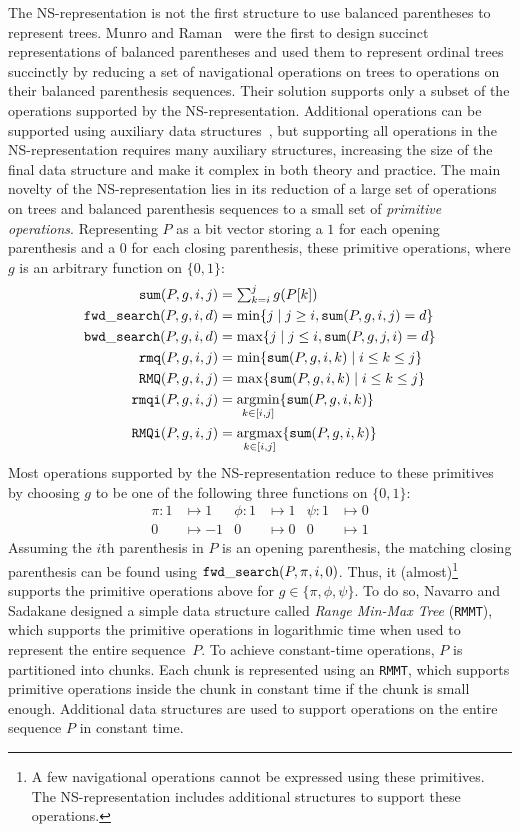 The NS-representa\-tion is not the first structure to use balanced
parentheses to represent trees.  Munro and Raman~\cite{mr1997} were
the first to design succinct representations of balanced parentheses
and used them to represent ordinal trees succinctly by reducing a set
of navigational operations on trees to operations on their balanced
parenthesis sequences.  Their solution supports only a subset of the
operations supported by the NS-representation.  Additional operations
can be supported using auxiliary data structures~\cite{ly2008}, but
supporting all operations in the NS-representation requires many
auxiliary structures, increasing the size of the final data structure
and make it complex in both theory and practice.  The main novelty of
the NS-representation lies in its reduction of a large set of
operations on trees and balanced parenthesis sequences to a small set
of \emph{primitive operations}.  Representing $P$ as a bit vector
storing a $1$ for each opening parenthesis and a $0$ for each closing
parenthesis, these primitive operations, where $g$ is an arbitrary
function on $\{0,1\}$:
  \begin{align*}
    \mathtt{sum}(P,g,i,j) &= \textstyle\sum_{k=i}^jg(P[k])\\
    \mathtt{fwd\_search}(P,g,i,d) &= \min\{j \mid j \ge i, \mathtt{sum}(P,g,i,j) = d\}\\
    \mathtt{bwd\_search}(P,g,i,d) &= \max\{j \mid j \le i, \mathtt{sum}(P,g,j,i) = d\}\\
    \mathtt{rmq}(P,g,i,j) &= \min\{\mathtt{sum}(P,g,i,k) \mid i\le k\le j\}\\
    \mathtt{RMQ}(P,g,i,j) &= \max\{\mathtt{sum}(P,g,i,k) \mid i\le k\le j\}\\
    \mathtt{rmqi}(P,g,i,j) &= \operatorname*{arg\!\min}_{k\in[i,j]}\{\mathtt{sum}(P,g,i,k)\}\\
    \mathtt{RMQi}(P,g,i,j) &= \operatorname*{arg\!\max}_{k\in[i,j]}\{\mathtt{sum}(P,g,i,k)\}
  \end{align*}
Most operations supported by the NS-representation reduce to these primitives
by choosing $g$ to be one of the following three functions on $\{0,1\}$:
\begin{align*}
\pi : 1 &\mapsto 1 &\phi : 1 &\mapsto 1 & \psi : 1 &\mapsto 0\\
0 &\mapsto -1 & 0 &\mapsto 0 & 0 &\mapsto 1
\end{align*}
Assuming the $i$th parenthesis in $P$ is an opening parenthesis, the
matching closing parenthesis can be found using
$\mathtt{fwd\_search}(P,\pi,i,0)$.  Thus, it (almost)\footnote{A few
  navigational operations cannot be expressed using these primitives.
  The NS-representation includes additional structures to support
  these operations.}  supports the primitive operations above for
$g \in \{\pi, \phi, \psi\}$.  To do so, Navarro and Sadakane designed
a simple data structure called \emph{Range Min-Max Tree} ({\tt RMMT}),
which supports the primitive operations in logarithmic time when used
to represent the entire sequence~$P$.  To achieve constant-time
operations, $P$ is partitioned into chunks.  Each chunk is represented
using an {\tt RMMT}, which supports primitive operations inside the
chunk in constant time if the chunk is small enough.  Additional data
structures are used to support operations on the entire sequence $P$
in constant time.

